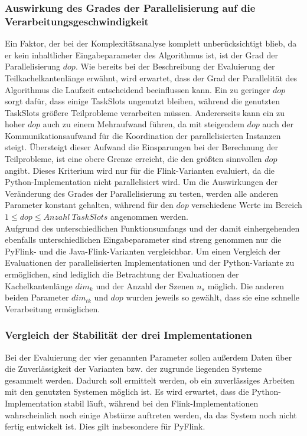 \subsubsection{Auswirkung des Grades der Parallelisierung auf die Verarbeitungsgeschwindigkeit}
Ein Faktor, der bei der Komplexitätsanalyse komplett unberücksichtigt blieb, da er kein inhaltlicher Eingabeparameter des Algorithmus ist, ist der Grad der Parallelisierung $dop$. Wie bereits bei der Beschreibung der Evaluierung der Teilkachelkantenlänge erwähnt, wird erwartet, dass der Grad der Parallelität des Algorithmus die Laufzeit entscheidend beeinflussen kann. Ein zu geringer $dop$ sorgt dafür, dass einige TaskSlots ungenutzt bleiben, während die genutzten TaskSlots größere Teilprobleme verarbeiten müssen. Andererseits kann ein zu hoher $dop$ auch zu einem Mehraufwand führen, da mit steigendem $dop$ auch der Kommunikationsaufwand für die Koordination der parallelisierten Instanzen steigt. Übersteigt dieser Aufwand die Einsparungen bei der Berechnung der Teilprobleme, ist eine obere Grenze erreicht, die den größten sinnvollen $dop$ angibt. Dieses Kriterium wird nur für die Flink-Varianten evaluiert, da die Python-Implementation nicht parallelisiert wird. Um die Auswirkungen der Veränderung des Grades der Parallelisierung zu testen, werden alle anderen Parameter konstant gehalten, während für den $dop$ verschiedene Werte im Bereich $1 \leq dop \leq Anzahl\ TaskSlots$ angenommen werden. \\

Aufgrund des unterschiedlichen Funktionsumfangs und der damit einhergehenden ebenfalls unterschiedlichen Eingabeparameter sind streng genommen nur die PyFlink- und die Java-Flink-Varianten vergleichbar. Um einen Vergleich der Evaluationen der parallelisierten Implementationen und der Python-Variante zu ermöglichen, sind lediglich die Betrachtung der Evaluationen der Kachelkantenlänge $dim_k$ und der Anzahl der Szenen $n_s$ möglich. Die anderen beiden Parameter $dim_{tk}$ und $dop$ wurden jeweils so gewählt, dass sie eine schnelle Verarbeitung ermöglichen.

\subsubsection{Vergleich der Stabilität der drei Implementationen}
Bei der Evaluierung der vier genannten Parameter sollen außerdem Daten über die Zuverlässigkeit der Varianten bzw. der zugrunde liegenden Systeme gesammelt werden. Dadurch soll ermittelt werden, ob ein zuverlässiges Arbeiten mit den genutzten Systemen möglich ist. Es wird erwartet, dass die Python-Implementation stabil läuft, während bei den Flink-Implementationen wahrscheinlich noch einige Abstürze auftreten werden, da das System noch nicht fertig entwickelt ist. Dies gilt insbesondere für PyFlink.

